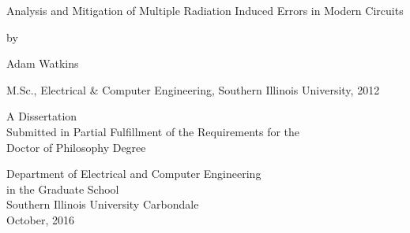 \begin{center}


Analysis and Mitigation of Multiple Radiation Induced Errors in Modern Circuits

\vskip 1.8in

by

Adam Watkins

M.Sc., Electrical \& Computer Engineering, Southern Illinois University, 2012

\vskip 2in

\vbox{\baselineskip=14pt
A Dissertation \\
Submitted in Partial Fulfillment of the Requirements for the \\
Doctor of Philosophy Degree
}

\vskip 2in


\vbox{\baselineskip=14pt
Department of Electrical and Computer Engineering \\
in the Graduate School \\
Southern Illinois University Carbondale \\
October, 2016
}

\end{center}
